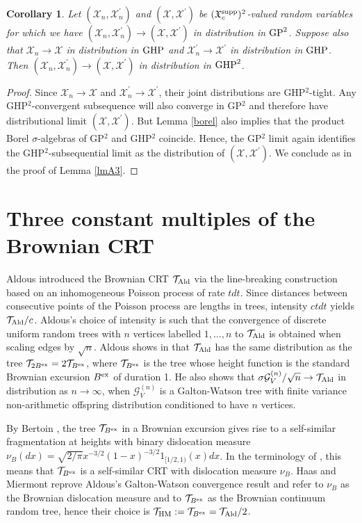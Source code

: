 \documentclass[11pt,a4paper]{article}
\newtheorem{cor}[prop]{Corollary}
\newcommand{\cG}{\mathcal{G}}
\newcommand{\cT}{\mathcal{T}}
\newcommand{\cX}{\mathcal{X}}
\begin{document}
\begin{appendix}
\begin{cor} Let $(\cX_n,\cX_n^\prime)$ and $(\cX,\cX^\prime)$ be $(\mathfrak{X}_c^{\rm supp})^2$-valued random variables for which we have
$(\cX_n,\cX_n^\prime)\rightarrow(\cX,\cX^\prime)$ in distribution in ${\rm GP}^2$. Suppose also that $\cX_n\rightarrow\cX$ in distribution in ${\rm GHP}$ and
$\cX_n^\prime\rightarrow\cX^\prime$ in distribution in ${\rm GHP}$. Then $(\cX_n,\cX_n^\prime)\rightarrow(\cX,\cX^\prime)$ in distribution in ${\rm GHP}^2$.
\end{cor}
\begin{proof} Since $\cX_n\rightarrow\cX$ and $\cX_n^\prime\rightarrow\cX^\prime$, their joint distributions are GHP$^2$-tight. Any GHP$^2$-convergent subsequence will also
  converge in GP$^2$ and therefore have distributional limit $(\cX,\cX^\prime)$. But Lemma \ref{borel} also implies that the product Borel $\sigma$-algebras of GP$^2$ and GHP$^2$
  coincide. Hence, the GP$^2$ limit again identifies the GHP$^2$-subsequential limit as the distribution of $(\cX,\cX^\prime)$. We conclude as in the proof of Lemma \ref{lmA3}.
\end{proof}


\section{Three constant multiples of the Brownian CRT}\label{appB}

Aldous \cite{Ald91,Ald91b,Ald93} introduced the Brownian CRT $\mathcal{T}_{\rm Ald}$ via the line-breaking construction based on an inhomogeneous Poisson process of rate
$tdt$. Since distances between consecutive points of the Poisson process are lengths in trees, intensity $ctdt$ yields $\mathcal{T}_{\rm Ald}/c$. Aldous's
choice of intensity is such that the convergence of discrete uniform random trees with $n$ vertices labelled $1,\ldots,n$ to $\cT_{\rm Ald}$ is obtained when scaling edges by $\sqrt{n}$. Aldous shows in
\cite[Corollary 22]{Ald93} that $\mathcal{T}_{\rm Ald}$ has the same distribution as the tree $\mathcal{T}_{2B^{\rm ex}}=2\mathcal{T}_{B^{\rm ex}}$, where $\mathcal{T}_{B^{\rm ex}}$ is the tree whose height function is the standard Brownian excursion  $B^{\rm ex}$ of
duration 1. He also shows that $\sigma\mathcal{\cG}_V^{(n)}/\sqrt{n}\rightarrow\mathcal{T}_{\rm Ald}$ in distribution as $n\rightarrow\infty$, when $\cG_V^{(n)}$ is a
Galton-Watson tree with finite variance non-arithmetic offspring distribution conditioned to have $n$ vertices.

By Bertoin \cite{Ber02}, the tree $\cT_{B^{\rm ex}}$ in a Brownian excursion gives rise to a self-similar fragmentation at heights with binary dislocation measure
$\nu_B(dx)=\sqrt{2/\pi}x^{-3/2}(1-x)^{-3/2}1_{[1/2,1)}(x)dx$. In the terminology of \cite{HaM04}, this means that $\cT_{B^{\rm ex}}$ is a self-similar CRT with dislocation measure
$\nu_B$. Haas and Miermont \cite{HM10} reprove Aldous's Galton-Watson convergence result and refer to $\nu_B$ as the Brownian dislocation measure and to $\cT_{B^{\rm ex}}$ as the Brownian continuum random tree, hence their choice is $\cT_{\rm HM}:=\cT_{B^{\rm ex}}=\cT_{\rm Ald}/2$. 


\end{appendix}
\end{document}
